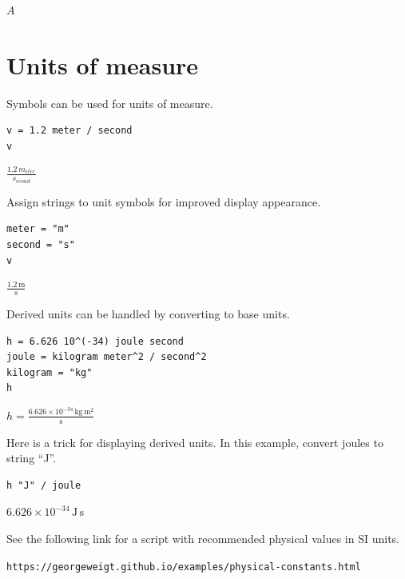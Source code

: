 \documentclass[12pt]{article}
\begin{document}
$\displaystyle A$

\newpage

\section{Units of measure}

Symbols can be used for units of measure.

{\color{blue}
\begin{verbatim}
v = 1.2 meter / second
v
\end{verbatim}}

$\displaystyle\frac{1.2\,m_{eter}}{s_{econd}}$

\bigskip
Assign strings to unit symbols for improved display appearance.

{\color{blue}
\begin{verbatim}
meter = "m"
second = "s"
v
\end{verbatim}}

$\displaystyle\frac{1.2\,\text{m}}{\text{s}}$

\bigskip
Derived units can be handled by converting to base units.

{\color{blue}
\begin{verbatim}
h = 6.626 10^(-34) joule second
joule = kilogram meter^2 / second^2
kilogram = "kg"
h
\end{verbatim}}

$\displaystyle h=\frac{6.626\times10^{-34}\,\text{kg}\,\text{m}^2}{\text{s}}$

\bigskip
Here is a trick for displaying derived units.
In this example, convert joules to string ``J''.

{\color{blue}
\begin{verbatim}
h "J" / joule
\end{verbatim}}

$6.626\times10^{-34}\,\text{J}\,\text{s}$

\bigskip
See the following link for a script with recommended physical values in SI units.

\bigskip
\verb$https://georgeweigt.github.io/examples/physical-constants.html$
\end{document}
